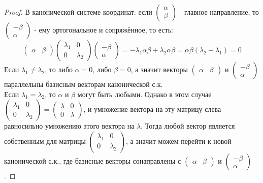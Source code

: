 \documentclass[a4paper, 12pt]{article}
\theoremstyle{definition}
\begin{document}
	\begin{proof}
		В канонической системе координат: если $\begin{pmatrix} \alpha \\ \beta \end{pmatrix}$ - главное направление, то $\begin{pmatrix} -\beta \\ \alpha \end{pmatrix}$ - ему ортогональное и сопряжённое, то есть: $$\begin{pmatrix} \alpha & \beta \end{pmatrix}\begin{pmatrix} \lambda_1&0 \\ 0&\lambda_2 \end{pmatrix}\begin{pmatrix} -\beta \\ \alpha \end{pmatrix} = -\lambda_1\alpha\beta + \lambda_2\alpha\beta = \alpha\beta(\lambda_2-\lambda_1) = 0$$
	Если $\lambda_1 \neq \lambda_2$, то либо $\alpha = 0$, либо $\beta = 0$, а значит векторы $\begin{pmatrix} \alpha & \beta \end{pmatrix}$ и $\begin{pmatrix} -\beta \\ \alpha \end{pmatrix}$ параллельны базисным векторам канонической с.к.\\
	Если $\lambda_1 = \lambda_2$, то $\alpha$ и $\beta$ могут быть любыми. Однако в этом случае $\begin{pmatrix} \lambda_1&0 \\ 0&\lambda_2 \end{pmatrix} = \begin{pmatrix} \lambda&0 \\ 0&\lambda \end{pmatrix}$, и умножение вектора на эту матрицу слева равносильно умножению этого вектора на $\lambda$. Тогда любой вектор является собственным для матрицы $\begin{pmatrix} \lambda_1&0 \\ 0&\lambda_2 \end{pmatrix}$, а значит можем перейти к новой канонической с.к., где базисные векторы сонаправлены с $\begin{pmatrix} \alpha & \beta \end{pmatrix}$ и $\begin{pmatrix} -\beta \\ \alpha \end{pmatrix}$.
	\end{proof}
\end{document}
